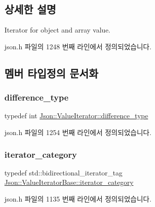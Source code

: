 \subsection{상세한 설명}
Iterator for object and array value. 

json.\+h 파일의 1248 번째 라인에서 정의되었습니다.



\subsection{멤버 타입정의 문서화}
\mbox{\label{class_json_1_1_value_iterator_a2be1a9aa60bbfc8812e9dd1a7f1a8786}} 
\subsubsection{\texorpdfstring{difference\+\_\+type}{difference\_type}}
{\footnotesize\ttfamily typedef int \hyperlink{class_json_1_1_value_iterator_a2be1a9aa60bbfc8812e9dd1a7f1a8786}{Json\+::\+Value\+Iterator\+::difference\+\_\+type}}



json.\+h 파일의 1254 번째 라인에서 정의되었습니다.

\mbox{\label{class_json_1_1_value_iterator_base_a02fd11a4fbdc0007da1e8bcf5e6b83c3}} 
\subsubsection{\texorpdfstring{iterator\+\_\+category}{iterator\_category}}
{\footnotesize\ttfamily typedef std\+::bidirectional\+\_\+iterator\+\_\+tag \hyperlink{class_json_1_1_value_iterator_base_a02fd11a4fbdc0007da1e8bcf5e6b83c3}{Json\+::\+Value\+Iterator\+Base\+::iterator\+\_\+category}\hspace{0.3cm}{\ttfamily [inherited]}}



json.\+h 파일의 1135 번째 라인에서 정의되었습니다.

